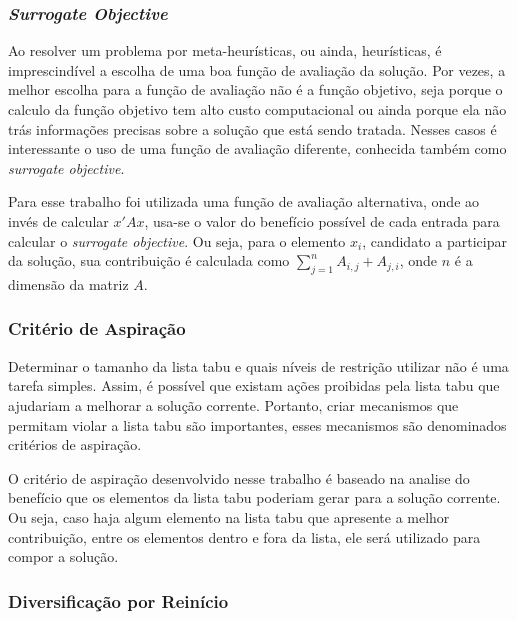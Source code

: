\documentclass[12pt,a4paper]{article}
\begin{document}
    \subsubsection{\it Surrogate Objective} 

        Ao resolver um problema por meta-heurísticas, ou ainda, heurísticas, é imprescindível a escolha de uma boa função de avaliação da solução. Por vezes, a melhor escolha para a função de
        avaliação não é a função objetivo, seja porque o calculo da  função objetivo tem alto custo computacional ou ainda porque ela não trás informações precisas sobre a solução que está sendo
        tratada. Nesses casos é interessante o uso de uma função de avaliação diferente, conhecida também como {\it surrogate objective}.

        Para esse trabalho foi utilizada uma função de avaliação alternativa, onde ao invés de calcular $x'Ax$, usa-se o valor do benefício possível de cada entrada para calcular o {\it surrogate
        objective}. Ou seja, para o elemento $x_i$, candidato a participar da solução, sua contribuição é calculada como $\sum_{j=1}^n A_{i,j}+A_{j,i}$, onde $n$ é a dimensão da matriz $A$.

    \subsubsection{Critério de Aspiração} 

        Determinar o tamanho da lista tabu e quais níveis de restrição utilizar não é uma tarefa simples. Assim, é possível que existam ações proibidas pela lista tabu que ajudariam a
        melhorar a solução corrente. Portanto, criar mecanismos que permitam violar a lista tabu são importantes, esses mecanismos são denominados critérios de aspiração. 

        O critério de aspiração desenvolvido nesse trabalho é baseado na analise do benefício que os elementos da lista tabu poderiam gerar para a solução corrente. Ou seja, caso haja algum elemento
        na lista tabu que apresente a melhor contribuição, entre os elementos dentro e fora da lista, ele será utilizado para compor a solução.

    \subsubsection{Diversificação por Reinício}
\end{document}
